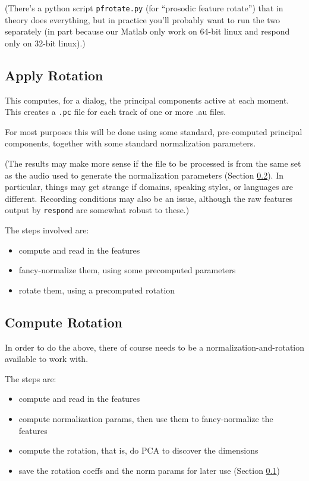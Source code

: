 \documentclass[11pt]{article}
\begin{document}
(There's a python script {\tt pfrotate.py} (for ``prosodic feature
rotate'') that in theory does everything, but in practice you'll
probably want to run the two separately (in part because our Matlab
only work on 64-bit linux and respond only on 32-bit linux).)


\subsection{Apply Rotation}    \label{applyrot}
 
This computes, for a dialog, the principal components active at each
moment.  This creates a {\tt .pc} file for each track of one or more .au
files.

For most purposes this will be done using some standard, pre-computed
principal components, together with some standard normalization
parameters.

(The results may make more sense if the file to be processed is from
the same set as the audio used to generate the normalization
parameters (Section \ref{computerotation}).  In particular, things may
get strange if domains, speaking styles, or languages are different.
Recording conditions may also be an issue, although the raw features
output by {\tt respond} are somewhat robust to these.)

The steps involved are:
\begin{itemize}   \setlength{\itemsep}{0pt}\setlength{\parskip}{0pt}
\item  compute and read in the features
\item  fancy-normalize them, using some precomputed parameters
\item  rotate them, using a precomputed rotation
\end{itemize}

\subsection{Compute Rotation} \label{computerotation}

In order to do the above, there of course needs to be a
normalization-and-rotation available to work with. 

The steps are:
\begin{itemize}   \setlength{\itemsep}{0pt}\setlength{\parskip}{0pt}
\item compute and read in the features
\item compute normalization params, then use them to fancy-normalize the features
\item compute the rotation, that is, do PCA to discover the dimensions
\item save the rotation coeffs and the norm params for later use (Section \ref{applyrot})
\end{itemize}
\end{document}
